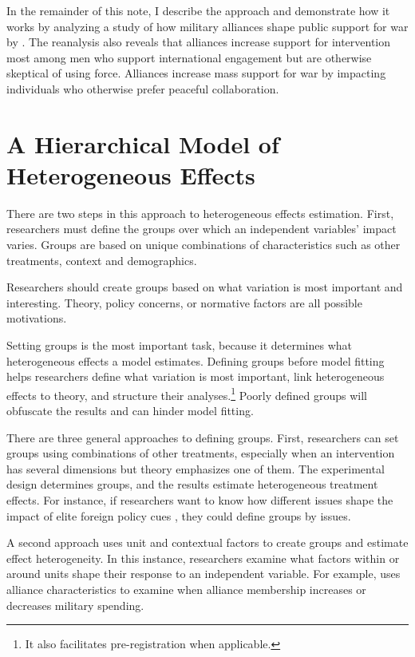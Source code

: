 \documentclass[12pt]{article}
\begin{document}
In the remainder of this note, I describe the approach and demonstrate how it works by analyzing a study of how military alliances shape public support for war by \citet{TomzWeeks2021}. 
The reanalysis also reveals that alliances increase support for intervention most among men who support international engagement but are otherwise skeptical of using force. 
Alliances increase mass support for war by impacting individuals who otherwise prefer peaceful collaboration. 



\section{A Hierarchical Model of Heterogeneous Effects}


There are two steps in this approach to heterogeneous effects estimation. 
First, researchers must define the groups over which an independent variables' impact varies. 
Groups are based on unique combinations of characteristics such as other treatments, context and demographics.


Researchers should create groups based on what variation is most important and interesting. 
Theory, policy concerns, or normative factors are all possible motivations. 


Setting groups is the most important task, because it determines what heterogeneous effects a model estimates. 
Defining groups before model fitting helps researchers define what variation is most important, link heterogeneous effects to theory, and structure their analyses.\footnote{It also facilitates pre-registration when applicable.}
Poorly defined groups will obfuscate the results and can hinder model fitting.   


There are three general approaches to defining groups.  
First, researchers can set groups using combinations of other treatments, especially when an intervention has several dimensions but theory emphasizes one of them. 
The experimental design determines groups, and the results estimate heterogeneous treatment effects.   
For instance, if researchers want to know how different issues shape the impact of elite foreign policy cues \citep{GuisingerSaunders2017}, they could define groups by issues. 


A second approach uses unit and contextual factors to create groups and estimate  effect heterogeneity. 
In this instance, researchers examine what factors within or around units shape their response to an independent variable.
For example, \citet{Alley2021isq} uses alliance characteristics to examine when alliance membership increases or decreases military spending.
\end{document}
